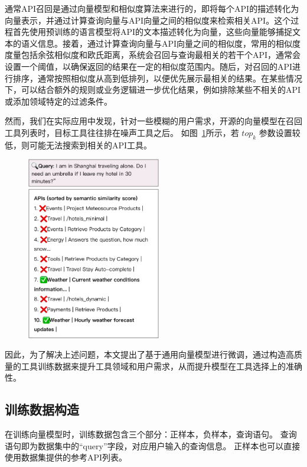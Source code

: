通常API召回是通过向量模型和相似度算法来进行的，即将每个API的描述转化为向量表示，并通过计算查询向量与API向量之间的相似度来检索相关API。这个过程首先使用预训练的语言模型将API的文本描述转化为向量，这些向量能够捕捉文本的语义信息。接着，通过计算查询向量与API向量之间的相似度，常用的相似度度量包括余弦相似度和欧氏距离，系统会召回与查询最相关的若干个API，通常会设置一个阈值，以确保返回的结果在一定的相似度范围内。随后，对召回的API进行排序，通常按照相似度从高到低排列，以便优先展示最相关的结果。在某些情况下，可以结合额外的规则或业务逻辑进一步优化结果，例如排除某些不相关的API或添加领域特定的过滤条件。

然而，我们在实际应用中发现，针对一些模糊的用户需求，开源的向量模型在召回工具列表时，目标工具往往排在噪声工具之后。
如图~\ref{fig:why-tune}所示，若 $top_k$ 参数设置较低，则可能无法搜索到相关的API工具。

\begin{figure}[!htp]
  \vspace{1em}
  \centering
  \setlength{\abovecaptionskip}{10pt} %
  \includegraphics[height=8cm]{../assets/ch3-为何需要微调.pdf}
  \label{fig:why-tune}
\end{figure}

因此，为了解决上述问题，本文提出了基于通用向量模型进行微调，通过构造高质量的工具训练数据来提升工具领域和用户需求，从而提升模型在工具选择上的准确性。

\subsection{训练数据构造}

在训练向量模型时，训练数据包含三个部分：正样本，负样本，查询语句。
查询语句即为数据集中的“query”字段，对应用户输入的查询信息。
正样本也可以直接使用数据集提供的参考API列表。

